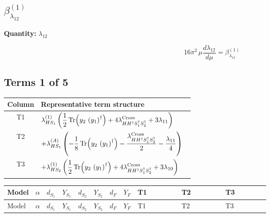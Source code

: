 \documentclass[8pt]{article}
\begin{document}
\begin{landscape}
\section*{$\beta_{\lambda_{12}}^{(1)}$}
\noindent\textbf{Quantity: }$\lambda_{12}$\par\smallskip
\[16\pi^2\,\mu\frac{d \lambda_{12}}{d\mu}=\beta_{\lambda_{12}}^{(1)}\]
\subsection*{Terms 1 of 5}
\begin{center}
\begin{tabular}{@{}c >{\raggedright\arraybackslash}p{0.82\linewidth}@{}}
\toprule
Column & Representative term structure \\
\midrule
T1 & \(\displaystyle {\lambda_{HS_1}^{(1)}} \left(\frac{1}{2} \operatorname{Tr}\!\left({y_2}\,\left({y_1}\right)^{\dagger}\right)+4 {\lambda_{H H^\dagger S_1^\dagger S_2^\dagger}^{\rm Cross}}+3 {\lambda_{11}}\right)\) \\
\midrule
T2 & \(\displaystyle +{\lambda_{HS_1}^{(A)}} \left(-\frac{1}{8} \operatorname{Tr}\!\left({y_2}\,\left({y_1}\right)^{\dagger}\right)-\frac{{\lambda_{H H^\dagger S_1^\dagger S_2^\dagger}^{\rm Cross}}}{2}-\frac{{\lambda_{11}}}{4}\right)\) \\
\midrule
T3 & \(\displaystyle +{\lambda_{HS_2}^{(1)}} \left(\frac{1}{2} \operatorname{Tr}\!\left({y_2}\,\left({y_1}\right)^{\dagger}\right)+4 {\lambda_{H H^\dagger S_1^\dagger S_2^\dagger}^{\rm Cross}}+3 {\lambda_{10}}\right)\) \\
\midrule
\bottomrule
\end{tabular}
\end{center}
\smallskip
\tiny
\begin{longtable}{@{}llcccccc >{\raggedright\arraybackslash}p{0.21\linewidth} >{\raggedright\arraybackslash}p{0.21\linewidth} >{\raggedright\arraybackslash}p{0.21\linewidth}@{}}
\toprule
Model & $\alpha$ & $d_{S_1}$ & $Y_{S_1}$ & $d_{S_2}$ & $Y_{S_2}$ & $d_F$ & $Y_F$ & T1 & T2 & T3 \\
\midrule
\endfirsthead
\toprule
Model & $\alpha$ & $d_{S_1}$ & $Y_{S_1}$ & $d_{S_2}$ & $Y_{S_2}$ & $d_F$ & $Y_F$ & T1 & T2 & T3 \\
\midrule
\endhead

\end{longtable}
\end{landscape}
\end{document}
